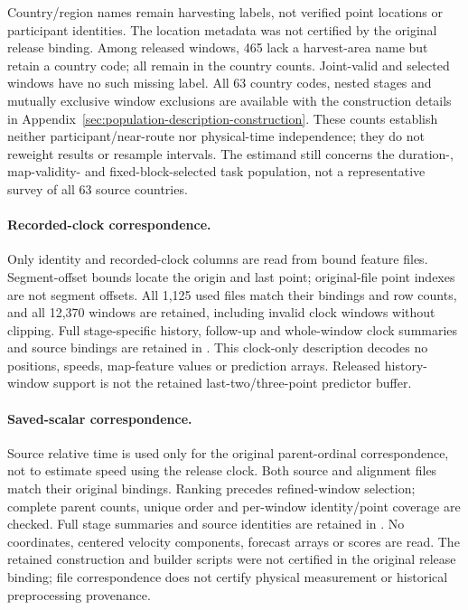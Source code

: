 \documentclass[11pt]{article}
\begin{document}
Country/region names remain harvesting labels, not verified point locations
or participant identities. The location metadata was not certified by the
original release binding. Among released windows, 465 lack a harvest-area
name but retain a country code; all remain in the country counts.
Joint-valid and selected windows have no such missing label.
All 63 country codes, nested stages and mutually exclusive window exclusions
are available with the construction details in
Appendix~\ref{sec:population-description-construction}.
These counts establish neither participant/near-route nor physical-time
independence; they do not reweight results or resample intervals.
The estimand still concerns the duration-, map-validity- and fixed-block-selected
task population, not a representative survey of all 63 source countries.

\paragraph{Recorded-clock correspondence.}
Only identity and recorded-clock columns are read from bound feature files.
Segment-offset bounds locate the origin and last point; original-file point
indexes are not segment offsets. All 1,125 used files match their bindings
and row counts, and all 12,370 windows are retained, including invalid clock
windows without clipping. Full stage-specific history, follow-up and
whole-window clock summaries and source bindings are retained in
.
This clock-only description decodes no positions, speeds, map-feature values
or prediction arrays. Released history-window support is not the retained
last-two/three-point predictor buffer.

\paragraph{Saved-scalar correspondence.}
Source relative time is used only for the original parent-ordinal
correspondence, not to estimate speed using the release clock. Both source
and alignment files match their original bindings. Ranking precedes
refined-window selection; complete parent counts, unique order and
per-window identity/point coverage are checked. Full stage summaries and
source identities are retained in
.
No coordinates, centered velocity components, forecast arrays or scores
are read. The retained construction and builder scripts were not certified
in the original release binding; file correspondence does not certify
physical measurement or historical preprocessing provenance.
\end{document}
